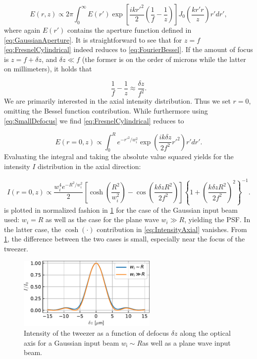 \begin{equation}\label{eq:FresnelCylindrical}
    E(r,z) \propto 2\pi
    \int_0^\infty E(r')\exp{\left[\frac{i k r'^2}{2}\left(\frac{1}{f}-\frac{1}{z}\right)\right]}
    J_0\left(\frac{k r'r}{z}\right)r' dr',
\end{equation}
where again $E(r')$ contains the aperture function defined in \cref{eq:GaussianAperture}. 
It is straightforward to see that for $z=f$ \cref{eq:FresnelCylindrical} indeed reduces to \cref{eq:FourierBessel}.
If the amount of focus is $z=f+\delta z$, and $\delta z \ll f$ (the former is on the order of microns while the latter on millimeters), it holds that

\begin{equation}\label{eq:SmallDefocus}
    \frac{1}{f}-\frac{1}{z}\approx
    \frac{\delta z}{f^2}.
\end{equation}
We are primarily interested in the axial intensity distribution.
Thus we set $r=0$, omitting the Bessel function contribution.
While furthermore using \cref{eq:SmallDefocus} we find \cref{eq:FresnelCylindrical} reduces to

\begin{equation}
    E(r=0,z) \propto \int_0^R e^{-r'^2/w_i^2} \exp{\left(
    \frac{i k \delta z}{2f^2}r'^2
    \right)} r'dr'.
\end{equation}
Evaluating the integral and taking the absolute value squared yields for the intensity $I$ distribution in the axial direction:

\begin{equation}\label{eq:IntensityAxial}
    I(r=0,z) \propto \frac{w_i^4 e^{-R^2/w_i^2}}{2} \left[
    \cosh\left(\frac{R^2}{w_i^2}\right)-\cos\left(\frac{k \delta z R^2}{2f^2}\right)
    \right]
    \left\{
    1+\left(\frac{k\delta z R^2}{2 f^2}\right)^2
    \right\}^{-1}.
\end{equation}
 is plotted in normalized fashion in \cref{fig:PSFvsLongitudinal} for the case of the Gaussian input beam used: $w_i = R$ as well as the case for the plane wave $w_i \gg R$, yielding the \ac{PSF}.
In the latter case, the $\cosh(\cdot)$ contribution in \cref{eq:IntensityAxial} vanishes.
From \cref{fig:PSFvsLongitudinal}, the difference between the two cases is small, especially near the focus of the tweezer.

\begin{figure}
    \centering
    \includegraphics[width=0.6\textwidth]{figures/LongitudinalTweezerField.pdf}
    \caption{Intensity of the tweezer as a function of defocus $\mathsf{\delta \textit{z}}$ along the optical axis for a Gaussian input beam $\mathsf{\textit{w}_i \sim \textit{R}}$as well as a plane wave input beam.}
    \label{fig:PSFvsLongitudinal}
\end{figure}

